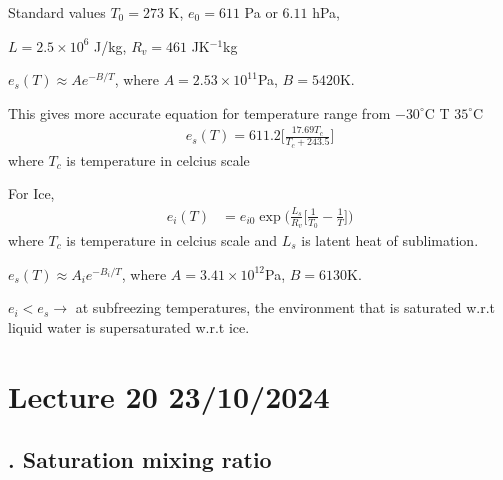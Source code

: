 \documentclass[fleqn,10pt]{SelfArx} %
\begin{document}
Standard values $T_0 = 273$ K, $e_0=611$ Pa or $6.11$ hPa,

$L= 2.5 \times 10^6$ J/kg, $R_v=461$ JK$^{-1}$kg

$e_s(T)\approx Ae^{-B/T}$, where $A=2.53\times10^{11}$Pa, $B=5420$K.

This gives more accurate equation for temperature range from $-30^\circ$C \leqslant T \leqslant $35^\circ$C
\begin{align}
    e_s(T) = 611.2\Big[\frac{17.69T_c}{T_c+243.5}\Big]
\end{align}
where $T_c$ is temperature in celcius scale

For Ice,
\begin{align}
    e_i(T) &= e_{i0}\exp\Big(\frac{L_s}{R_v} \Big[\frac{1}{T_0} - \frac{1}{T}\Big]\Big)
\end{align}
where $T_c$ is temperature in celcius scale and $L_s$ is latent heat of sublimation.

$e_s(T)\approx A_ie^{-B_i/T}$, where $A=3.41\times10^{12}$Pa, $B=6130$K.

%

$e_i < e_s \rightarrow$ at subfreezing temperatures, the environment that is saturated w.r.t liquid water is supersaturated w.r.t ice.

\clearpage

\section{Lecture 20 23/10/2024}
\subsection{. Saturation mixing ratio}
\end{document}
